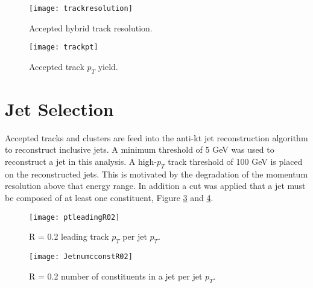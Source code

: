 \begin{figure}[h]
\texttt{[image: trackresolution]}
\centering
\caption{Accepted hybrid track resolution.}
\label{fig:trackresolution}
\end{figure}

\begin{figure}[h]
\texttt{[image: trackpt]}
\centering
\caption{Accepted track $p_{T}$ yield.}
\label{fig:hybtrackpt}
\end{figure}


\section{Jet Selection}

Accepted tracks and clusters are feed into the anti-kt jet reconstruction algorithm to reconstruct inclusive jets.  A minimum threshold of 5 GeV was used to reconstruct a jet in this analysis.  A high-$p_{T}$ track threshold of 100 GeV is placed on the reconstructed jets.  This is motivated by the degradation of the momentum resolution above that energy range.  In addition a cut was applied that a jet must be composed of at least one constituent, Figure \ref{fig:JetPt} and \ref{fig:JetConst}.

\begin{figure}[h]
\texttt{[image: ptleadingR02]}
\centering
\caption{R = 0.2 leading track $p_{T}$ per jet $p_{T}$.}
\label{fig:JetPt}
\end{figure}

\begin{figure}[h]
\texttt{[image: JetnumcconstR02]}
\centering
\caption{R = 0.2 number of constituents in a jet per jet $p_{T}$.}
\label{fig:JetConst}
\end{figure}







